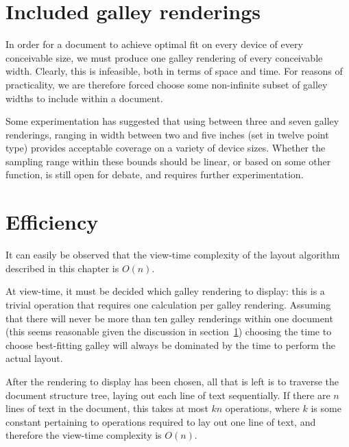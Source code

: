 \section{Included galley renderings}
\label{sec:inc-renderings}
In order for a document to achieve optimal fit on every device of every conceivable size, we must produce one galley rendering of every conceivable width. Clearly,  this is infeasible, both in terms of space and time. For reasons of practicality, we are therefore forced choose some non-infinite subset of galley widths to include within a document.

Some experimentation has suggested that using between three and seven galley renderings, ranging in width between two and five inches (set in twelve point type) provides acceptable coverage on a variety of device sizes. Whether the sampling range within these bounds should be linear, or based on some other function, is still open for debate, and requires further experimentation.




\section{Efficiency}

It can easily be observed that the view-time complexity of the layout algorithm described in this chapter is $O(n)$.

At view-time, it must be decided which galley rendering to display: this is a trivial operation that requires one calculation per galley rendering. Assuming that there will never be more than ten galley renderings within one document (this seems reasonable given the discussion in section~\ref{sec:inc-renderings}) choosing the time to choose best-fitting galley will always be dominated by the time to perform the actual layout.

After the rendering to display has been chosen, all that is left is to traverse the document structure tree, laying out each line of text sequentially. If there are $n$ lines of text in the document, this takes at most $kn$ operations, where $k$ is some constant pertaining to operations required to lay out one line of text, and therefore the view-time complexity is $O(n)$.

